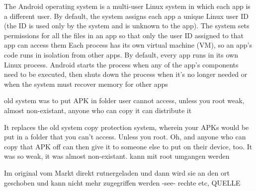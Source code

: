 %
The Android operating system is a multi-user Linux system in which each app is a different user.
By default, the system assigns each app a unique Linux user ID (the ID is used only by the system and is unknown to the app). The system sets permissions for all the files in an app so that only the user ID assigned to that app can access them
Each process has its own virtual machine (VM), so an app's code runs in isolation from other apps.
By default, every app runs in its own Linux process. Android starts the process when any of the app's components need to be executed, then shuts down the process when it's no longer needed or when the system must recover memory for other apps

\cite{developerFundamentals}
%

old system was to put APK in folder user cannot access, unless you root
weak, almost non-existant, anyone who can copy it can distribute it


It replaces the old system copy protection system, wherein your APKs would be put in a folder that you can't access. Unless you root. Oh, and anyone who can copy that APK off can then give it to someone else to put on their device, too. It was so weak, it was almost non-existant.\newline
kann mit root umgangen werden


Im original vom Markt direkt rutnergeladen und dann wird sie an den ort geschoben und kann nicht mehr zugegriffen werden -see- rechte etc, QUELLE\newline
